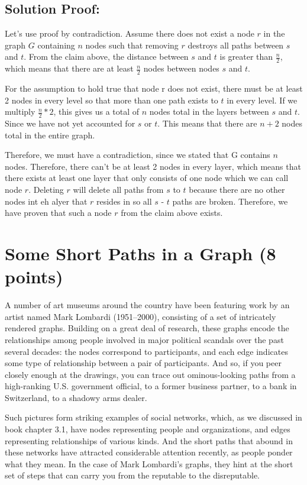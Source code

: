 \documentclass[letter,11pt]{article}
\begin{document}
\subsection{Solution Proof:}

Let's use proof by contradiction. Assume there does not exist a node $r$ in the graph $G$ containing $n$ nodes such that removing $r$ destroys all paths between $s$ and $t$. From the claim above, the distance between $s$ and $t$ is greater than $\frac{n}{2}$, which means that there are at least $\frac{n}{2}$ nodes between nodes $s$ and $t$.

For the assumption to hold true that node r does not exist, there must be at least 2 nodes in every level so that more than one path exists to $t$ in every level. If we multiply $\frac{n}{2} * 2$, this gives us a total of $n$ nodes total in the layers between $s$ and $t$. Since we have not yet accounted for $s$ or $t$. This means that there are $n + 2$ nodes total in the entire graph.

Therefore, we must have a contradiction, since we stated that G contains $n$ nodes. Therefore, there can't be at least 2 nodes in every layer, which means that there exists at least one layer that only consists of one node which we can call node $r$. Deleting $r$ will delete all paths from $s$ to $t$ because there are no other nodes int eh alyer that $r$ resides in so all $s$ - $t$ paths are broken. Therefore, we have proven that such a node $r$ from the claim above exists.




\section{Some Short Paths in a Graph (8 points)}

A number of art museums around the country have been featuring work by an artist named Mark Lombardi (1951–2000), consisting of a set of intricately rendered graphs. Building on a great deal of research, these graphs encode the relationships among people involved in major political scandals over the past several decades: the nodes correspond to participants, and each edge indicates some type of relationship between a pair of participants. And so, if you peer closely enough at the drawings, you can trace out ominous-looking paths from a high-ranking U.S. government official, to a former business partner, to a bank in Switzerland, to a shadowy arms dealer.

Such pictures form striking examples of social networks, which, as we discussed in book chapter 3.1, have nodes representing people and organizations, and edges representing relationships of various kinds. And the short paths that abound in these networks have attracted considerable attention recently, as people ponder what they mean. In the case of Mark Lombardi's graphs, they hint at the short set of steps that can carry you from the reputable to the disreputable.
\end{document}
